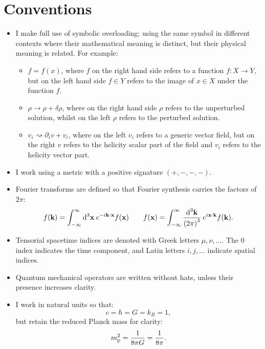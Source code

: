 \chapter{Conventions}
\label{sec:cos:conventions}


\begin{itemize}
  \item I make full use of symbolic overloading; using the same symbol in different contexts where their mathematical meaning is distinct, but their physical meaning is related. For example:
    \begin{itemize}
      \item \(f=f(x)\), where \(f\) on the right hand side refers to a function \({f:X\to Y}\), but on the left hand side \(f\in Y\) refers to the image of \(x\in X\) under the function \(f\).
      \item \(\rho \rightarrow \rho + \delta\rho\), where on the right hand side \(\rho\) refers to the unperturbed solution, whilst on the left \(\rho\) refers to the perturbed solution.
      \item \(v_i \rightsquigarrow \partial_i v + v_i\), where on the left \(v_i\) refers to a generic vector field, but on the right \(v\) refers to the helicity scalar part of the field and \(v_i\) refers to the helicity vector part.
    \end{itemize}
  \item I work using a metric with a positive signature \((+,-,-,-)\).
  \item Fourier transforms are defined so that Fourier synthesis carries the factors of \(2\pi\):
    \begin{equation}
      f(\vk) = \int_{-\infty}^{\infty} \d[3]{\vx}\: e^{-i \vk\cdot\vx} f(\vx) \qquad f(\vx) = \int_{-\infty}^{\infty} \frac{\d[3]{\vk}}{{(2\pi)}^3}\: e^{i \vx\cdot\vk} f(\vk).
      \label{eqn:cos:fourier_transform}
    \end{equation}
  \item Tensorial spacetime indices are denoted with Greek letters \(\mu,\nu,\ldots\). The \(0\) index indicates the time component, and Latin letters \(i,j,\ldots\) indicate spatial indices.
  \item Quantum mechanical operators are written without hats, unless their presence increases clarity.
  \item I work in natural units so that:
    \begin{equation}
      c = \hbar = G = k_B = 1,
      \label{eqn:cos:natural_units}
    \end{equation}
    but retain the reduced Planck mass for clarity:
    \begin{equation}
      \m^2 = \frac{1}{8\pi G} = \frac{1}{8\pi}.
      \label{eqn:cos:reduced_planck_mass}
    \end{equation}
\end{itemize}


